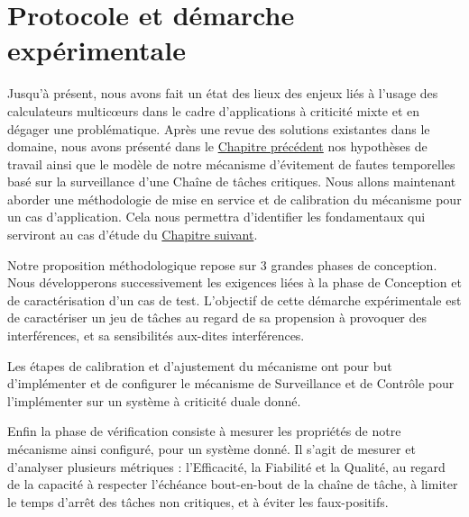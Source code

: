 \documentclass[french, a4paper, 11pt, twoside, pdftex]{StyleThese}
\begin{document}
\setcounter{chapter}{3} %
\dominitoc
\faketableofcontents
\fi

\chapter{Protocole et démarche expérimentale} \label{chap:4_ProtocolExpe}
\minitoc

Jusqu'à présent, nous avons fait un état des lieux des enjeux liés à l'usage des calculateurs multicœurs dans le cadre d'applications à criticité mixte et en dégager une problématique. Après une revue des solutions existantes dans le domaine, nous avons présenté dans le \hyperref[chap:3_PrincipeArchi]{Chapitre précédent} nos hypothèses de travail ainsi que le modèle de notre mécanisme d'évitement de fautes temporelles basé sur la surveillance d'une Chaîne de tâches critiques. Nous allons maintenant aborder une méthodologie de mise en service et de calibration du mécanisme pour un cas d'application. Cela nous permettra d'identifier les fondamentaux qui serviront au cas d'étude du \hyperref[chap:5_ImplementationCase]{Chapitre suivant}.

Notre proposition méthodologique repose sur 3 grandes phases de conception. Nous développerons successivement les exigences liées à la phase de Conception et de caractérisation d'un cas de test. L'objectif de cette démarche expérimentale est de caractériser un jeu de tâches au regard de sa propension à provoquer des interférences, et sa sensibilités aux-dites interférences. 

Les étapes de calibration et d'ajustement du mécanisme ont pour but d'implémenter et de configurer le mécanisme de Surveillance et de Contrôle pour l'implémenter sur un système à criticité duale donné.

Enfin la phase de vérification consiste à mesurer les propriétés de notre mécanisme ainsi configuré, pour un système donné. Il s'agit de mesurer et d'analyser plusieurs métriques : l'Efficacité, la Fiabilité et la Qualité, au regard de la capacité à respecter l'échéance bout-en-bout de la chaîne de tâche, à limiter le temps d'arrêt des tâches non critiques, et à éviter les faux-positifs.



\pagebreak
\end{document}
